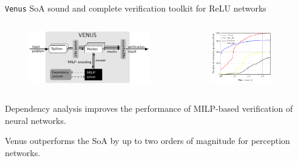 \documentclass[10pt]{beamer}
\begin{document}

\begin{frame}{\texttt{Venus}}
	SoA sound and complete verification toolkit for ReLU networks
	\vspace{1em}
\begin{columns}
\begin{column}{0.5\textwidth}
\begin{figure}
\centering
\includegraphics[width=1.2\textwidth]{venus2.pdf}
\end{figure}
\end{column}
\begin{column}{0.5\textwidth}
\begin{figure}
\centering
\includegraphics[width=0.8\textwidth]{venus.pdf}
\end{figure}
\end{column}
\end{columns}
\vspace{1em}
Dependency analysis improves the performance of MILP-based
verification of neural networks.
\vspace{1em}

Venus outperforms the SoA by up to \alert{two orders of magnitude}
for perception networks.
\end{frame}
\end{document}
